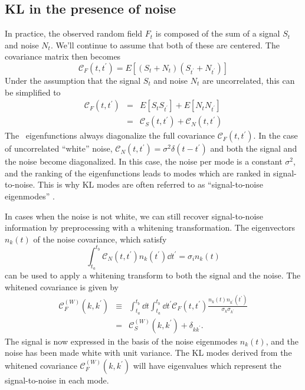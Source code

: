\subsection{KL in the presence of noise}
\label{sec:whitening}
In practice, the observed random field $F_t$ is composed of the sum of
a signal $S_t$ and noise $N_t$.  We'll continue to assume that both of these
are centered.  The covariance matrix then becomes
\begin{equation}
  \mathcal{C}_F(t, t^\prime) = E[(S_t + N_t)(S_{t^\prime}+N_{t^\prime})]
\end{equation}
Under the assumption that the signal $S_t$ and noise $N_t$ are uncorrelated,
this can be simplified to
\begin{eqnarray}
  \mathcal{C}_F(t, t^\prime) &=& E[S_t S_{t^\prime}]
  + E[N_t N_{t^\prime}] \nonumber\\
  &=& \mathcal{C}_S(t, t^\prime) + \mathcal{C}_N(t, t^\prime)
\end{eqnarray}
The \KL\ eigenfunctions always diagonalize the full covariance
$\mathcal{C}_F(t, t^\prime)$.
In the case of uncorrelated ``white'' noise,
$\mathcal{C}_N(t, t^\prime) = \sigma^2 \delta(t - t^\prime)$
and both the signal and the noise become diagonalized.  In this case,
the noise per mode is a constant $\sigma^2$, and the ranking of the
eigenfunctions leads to modes which are ranked in signal-to-noise.
This is why KL modes are often referred to as ``signal-to-noise
eigenmodes'' \citep{Vogeley96}.

In cases when the noise is not white, we can still recover signal-to-noise
information by preprocessing with a whitening transformation.  The eigenvectors
$n_k(t)$ of the noise covariance, which satisfy
\begin{equation}
  \int_{t_a}^{t_b} \mathcal{C}_N(t, t^\prime) n_k(t^\prime) \dd t^\prime 
  = \sigma_i n_k(t)
\end{equation}
can be used to apply a whitening transform to both the signal and the
noise.  The whitened covariance is given by
\begin{eqnarray}
  \mathcal{C}_F^{(W)}(k, k^\prime) &\equiv& \int_{t_a}^{t_b}\dd t\int_{t_a}^{t_b}\dd t^\prime
  \mathcal{C}_F(t, t^\prime)
  \frac{n_k(t) n_{k^\prime}(t^\prime)}{\sigma_k\sigma_{k^\prime}}\nonumber\\
  &=& \mathcal{C}_S^{(W)}(k, k^\prime) + \delta_{kk^\prime}.
\end{eqnarray}
The signal is now expressed in the basis of the noise eigenmodes $n_k(t)$,
and the noise has been made white with unit variance.  The KL modes derived
from the whitened covariance $\mathcal{C}_F^{(W)}(k, k^\prime)$ will have
eigenvalues which represent the signal-to-noise in each mode.

